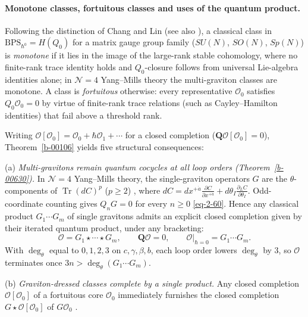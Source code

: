 \documentclass[11pt]{article}
\numberwithin{equation}{section}
\numberwithin{figure}{section}
\numberwithin{table}{section}
\begin{document}
\paragraph{Monotone classes, fortuitous classes and uses of the quantum product.}\label{uses-of-the-quantum-product}

Following the distinction of Chang and Lin \cite[Section 2.3]{ChangLinCover} (see also \cite{microstates,ChangChevalley}), a classical class in $\mathrm{BPS}_{\hbar^0}=H(Q_0)$ for a matrix gauge group family ($SU(N)$, $SO(N)$, $Sp(N)$) is \emph{monotone} if it lies in the image of the large-rank stable cohomology, where no finite-rank trace identity holds and $Q_0$-closure follows from universal Lie-algebra identities alone; in $\mathcal N=4$ Yang--Mills theory the multi-graviton classes are monotone. A class is \emph{fortuitous} otherwise: every representative $\mathcal O_0$ satisfies $Q_0\mathcal O_0=0$ by virtue of finite-rank trace relations (such as Cayley--Hamilton identities) that fail above a threshold rank.

Writing $\mathcal O[\mathcal O_0]=\mathcal O_0+\hbar\mathcal O_1+\cdots$ for a closed completion ($\mathbf Q\mathcal O[\mathcal O_0]=0$), Theorem~\ref{b-00106} yields five structural consequences:

(a) \emph{Multi-gravitons remain quantum cocycles at all loop orders (Theorem~\ref{b-00630}).} In $\mathcal N=4$ Yang--Mills theory, the single-graviton operators $G$ are the $\theta$-components of $\operatorname{Tr}(dC)^p$ ($p\ge2$) \cite[Section 4]{ChangYin}, where $dC=dx^{+\dot a}\tfrac{\partial C}{\partial x^{+\dot a}}+d\theta_I\tfrac{\partial_L C}{\partial\theta_I}$. Odd-coordinate counting gives $Q_nG=0$ for every $n\ge0$ \eqref{eq-2-60}. Hence any classical product $G_1\cdots G_m$ of single gravitons admits an explicit closed completion given by their iterated quantum product, under any bracketing:
\begin{equation}\label{eq-sum-multigraviton}
\mathcal O=G_1\star\cdots\star G_m,\qquad
\mathbf Q\mathcal O=0,\qquad
\left.\mathcal O\right|_{\hbar=0}=G_1\cdots G_m.
\end{equation}
With $\deg_\theta$ equal to $0,1,2,3$ on $c,\gamma,\beta,b$, each loop order lowers $\deg_\theta$ by $3$, so $\mathcal O$ terminates once $3n>\deg_\theta(G_1\cdots G_m)$.

(b) \emph{Graviton-dressed classes complete by a single product.} Any closed completion $\mathcal O[\mathcal O_0]$ of a fortuitous core $\mathcal O_0$ immediately furnishes the closed completion $G\star\mathcal O[\mathcal O_0]$ of $G\mathcal O_0$ \cite[supplement, Section S8.3]{Repo}.
\end{document}
